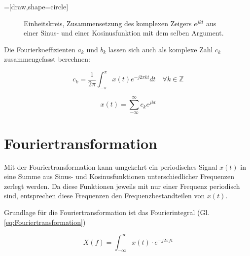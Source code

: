 =[draw,shape=circle]
\begin{figure}[ht]
\centering
{}
\caption{Einheitskreis, Zusammensetzung des komplexen Zeigers $e^{jkt}$ aus einer Sinus- und einer Kosinusfunktion mit dem selben Argument.}
\label{pic:Einheitskreis}
\end{figure}


Die Fourierkoeffizienten $a_k$ und $b_k$ lassen sich auch als komplexe Zahl $c_k$ zusammengefasst berechnen:

\begin{equation}
 c_k = \frac{1}{2\pi} \int_{-\pi}^{\pi} x(t) e^{-j2\pi kt} dt \quad \forall k \in \mathbb{Z}
\end{equation}



\begin{equation}
 x(t) = \sum_{-\infty}^{\infty} c_k e^{jkt}
\end{equation}


\section{Fouriertransformation}
Mit der Fouriertransformation kann umgekehrt ein periodisches Signal $x(t)$ in eine Summe aus Sinus- und
Kosinusfunktionen unterschiedlicher Frequenzen zerlegt werden. Da diese Funktionen jeweils mit nur einer Frequenz periodisch sind, entsprechen diese
Frequenzen den Frequenzbestandteilen von $x(t)$. 

Grundlage für die Fouriertransformation ist das Fourierintegral (Gl. \ref{eq:Fouriertransformation})

\begin{equation}\label{eq:Fouriertransformation}
 X(f) = \int^{\infty}_{-\infty} x(t) \cdot e^{-j 2 \pi f t}
\end{equation}

